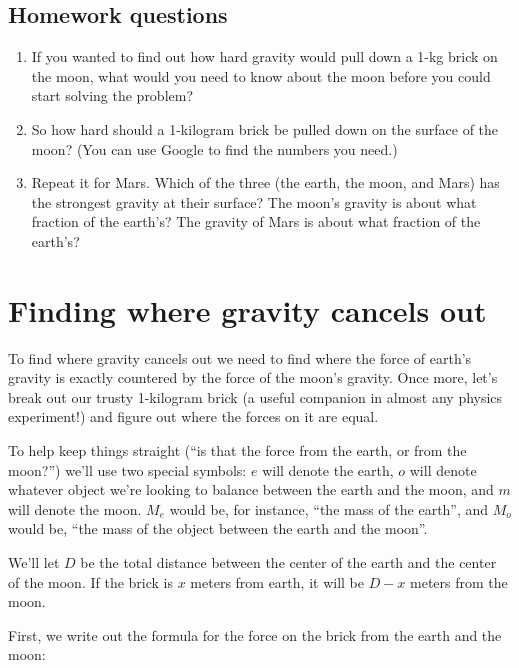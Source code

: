 \documentclass[10pt,letterpaper]{report}
\begin{document}
\subsection{Homework questions}
\begin{enumerate}
\item
If you wanted to find out how hard gravity would pull down a 1-kg brick on
the moon, what would you need to know about the moon before you could start
solving the problem?
\item
So how hard should a 1-kilogram brick be pulled down on the surface of
the moon?  (You can use Google to find the numbers you need.)
\item
Repeat it for Mars.  Which of the three (the earth, the moon, and Mars) has the
strongest gravity at their surface?  The moon's gravity is about what
fraction of the earth's?  The gravity of Mars is about what fraction of
the earth's?
\end{enumerate}

\section{Finding where gravity cancels out}

To find where gravity cancels out we need to find where the force of
earth's gravity is exactly countered by the force of the moon's
gravity.  Once more, let's break out our trusty 1-kilogram brick (a
useful companion in almost any physics experiment!) and figure out where the forces on it are equal.

To help keep things straight (``is that the force from the earth, or from the
moon?'') we'll use two special symbols: $e$ will denote the earth, $o$
will denote whatever object we're looking to balance between the earth
and the moon, and $m$ will denote the moon.  $M_{e}$ would be, for
instance, ``the mass of the earth'', and $M_{o}$ would be,
``the mass of the object between the earth and the moon''.

We'll let $D$ be the total distance between the center of the earth
and the center of the moon.  If the brick is $x$ meters from earth, it
will be $D-x$ meters from the moon.

First, we write out the formula for the force on the brick from the earth and
the moon:

\newpage
\end{document}
